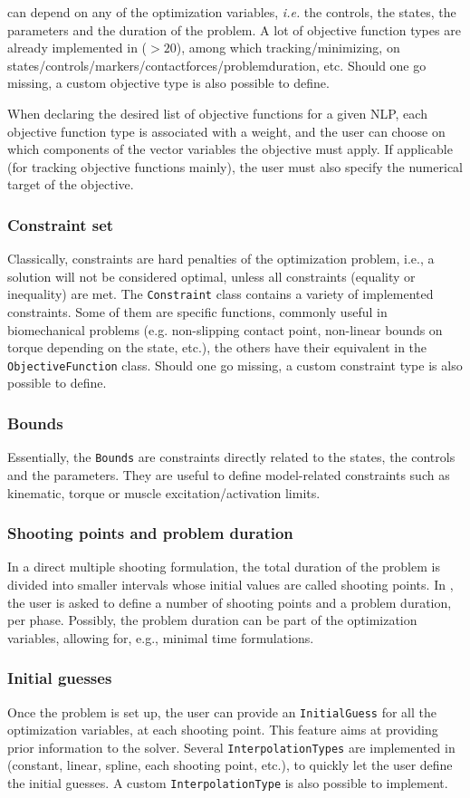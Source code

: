 \objectives can depend on any of the optimization variables, \textit{i.e.} the controls, the states, the parameters and the duration of the problem. 
A lot of objective function types are already implemented in \bioptim ($>\!20$), among which tracking\:/\:minimizing, on states\:/\:controls\:/\:markers\:/\:contact\:forces\:/\:problem\:duration, etc. 
Should one go missing, a custom objective type is also possible to define.

When declaring the desired list of objective functions for a given NLP, each objective function type is associated with a weight, and the user can choose on which components of the vector variables the objective must apply. 
If applicable (for tracking objective functions mainly), the user must also specify the numerical target of the objective.

\subsubsection{Constraint set}
Classically, constraints are hard penalties of the optimization problem, i.e., a solution will not be considered optimal, unless all constraints (equality or inequality) are met.
The \texttt{Constraint} class contains a variety of implemented constraints.
Some of them are specific functions, commonly useful in biomechanical problems (e.g. non-slipping contact point, non-linear bounds on torque depending on the state, etc.), the others have their equivalent in the \texttt{ObjectiveFunction} class.
Should one go missing, a custom constraint type is also possible to define.

\subsubsection{Bounds}
Essentially, the \texttt{Bounds} are constraints directly related to the states, the controls and the parameters.
They are useful to define model-related constraints such as kinematic, torque or muscle excitation\:/\:activation limits. 

\subsubsection{Shooting points and problem duration}
In a direct multiple shooting formulation, the total duration of the problem is divided into smaller intervals whose initial values are called shooting points. 
In \bioptim, the user is asked to define a number of shooting points and a problem duration, per phase.
Possibly, the problem duration can be part of the optimization variables, allowing for, e.g., minimal time formulations.

\subsubsection{Initial guesses}
Once the problem is set up, the user can provide an \texttt{InitialGuess} for all the optimization variables, at each shooting point.
This feature aims at providing prior information to the solver.
Several \texttt{InterpolationTypes} are implemented in \bioptim (constant, linear, spline, each shooting point, etc.), to quickly let the user define the initial guesses.
A custom \texttt{InterpolationType} is also possible to implement.
